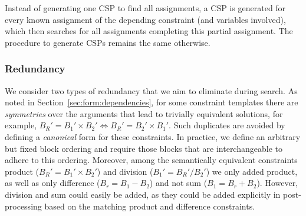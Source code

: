\documentclass{IEEEtran}
\newcommand{\samuel}[1]{\textcolor{green}{{\sc Samuel:} #1}\xspace}
\newcommand{\format}[1]{\textit{#1}\xspace}
\newcommand{\sname}{\format{TaCLe}}
\newcommand{\eccalc}[2]{\ensuremath{#1 = #2}}
\newcommand{\ecprod}[3]{\eccalc{#1}{#2 \times #3}}
\newcommand{\ecdiff}[3]{\eccalc{#1}{#2 - #3}}
\newcommand{\sbs}{B}
\newcommand{\sbl}[1]{\ensuremath{\sbs_{\textit{#1}}}}
\theoremstyle{definition}
\begin{document}
Instead of generating one CSP to find all assignments, a CSP is generated for every known assignment of the depending constraint (and variables involved), which then searches for all assignments completing this partial assignment.
The procedure to generate CSPs remains the same otherwise.





%





\subsubsection{Redundancy}
We consider two types of redundancy that we aim to eliminate during search.
As noted in Section~\ref{sec:form:dependencies}, for some constraint templates there are \textit{symmetries} over the arguments that lead to trivially equivalent solutions, for example, $\ecprod{\sbl{R}'}{\sbl{1}'}{\sbl{2}'} \Leftrightarrow \ecprod{\sbl{R}'}{\sbl{2}'}{\sbl{1}'}$.
Such duplicates are avoided by defining a \textit{canonical} form for these constraints.
In practice, we define an arbitrary but fixed block ordering and require those blocks that are interchangeable to adhere to this ordering.
Moreover, among the semantically equivalent constraints product (\ecprod{\sbl{R}'}{\sbl{1}'}{\sbl{2}'}) and division (\eccalc{\sbl{1}'}{\sbl{R}' / \sbl{2}'}) we only added product, as well as only difference (\ecdiff{\sbl{r}}{\sbl{1}}{\sbl{2}}) and not sum (\eccalc{\sbl{1}}{\sbl{r} + \sbl{2}}). However, division and sum could easily be added, as they could be added explicitly in post-processing based on the matching product and difference constraints.
\end{document}
